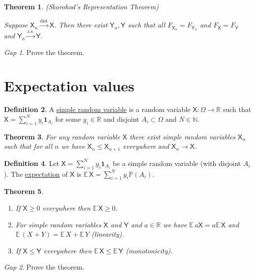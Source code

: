 \documentclass[11pt]{article}
\newcommand{\rv}[1]{\mathsf{#1}}
\newcommand{\p}{\mathbb{P}}
\newcommand{\ex}{\mathbb{E}\,}
\newcommand{\ind}[1]{\mathbf{1}_{#1}}
\newcommand{\defname}[1]{\underline{#1}}
\newcommand{\asto}{\xrightarrow{\text{a.s.}}}
\newcommand{\disto}{\xrightarrow{\text{dist}}}
\newcommand{\NN}{\mathbb{N}}
\newcommand{\RR}{\mathbb{R}}
\theoremstyle{theorem}
\newtheorem{theorem}{Theorem}[section]
\theoremstyle{definition}
\newtheorem{definition}[theorem]{Definition}
\theoremstyle{remark}
\theoremstyle{step}
\theoremstyle{gap}
\newtheorem*{gap}{Gap}
\begin{document}
\begin{theorem}{(Skorohod's Representation Theorem)}\ 

Suppose \(\rv{X}_n \disto \rv{X}\). Then there exist \(\rv{Y}_n, \rv{Y}\) such that all \(F_{\rv{X}_n} = F_{\rv{Y}_n}\) and \(F_\rv{X} = F_\rv{Y}\) and \(\rv{Y}_n \asto \rv{Y}\).
\end{theorem}

\begin{gap}
Prove the theorem.
\end{gap}


\section{Expectation values}

\begin{definition}
A \defname{simple random variable} is a random variable \(\rv{X}:\Omega \to \RR\) such that \(\rv{X} = \sum_{i=1}^N y_i \ind{A_i}\) for some \(y_i \in \RR\) and disjoint \(A_i \subset \Omega\) and \(N \in \NN\).
\end{definition}

\begin{theorem}
For any random variable \(\rv{X}\) there exist simple random variables \(\rv{X}_n\) such that for all \(n\) we have \(\rv{X}_n \leq \rv{X}_{n+1}\) everywhere and \(\rv{X}_n \to \rv{X}\).
\end{theorem}

\begin{definition}
Let \(\rv{X} = \sum_{i=1}^N y_i \ind{A_i}\) be a simple random variable (with disjoint \(A_i\)). The \defname{expectation} of \(\rv{X}\) is \(\ex \rv{X} = \sum_{i=1}^N y_i \p(A_i)\).
\end{definition}

\begin{theorem}\ 
\begin{enumerate}
\item If \(\rv{X} \geq 0\) everywhere then \(\ex \rv{X} \geq 0\).
\item For simple random variables \(\rv{X}\) and \(\rv{Y}\) and \(a \in \RR\) we have \(\ex a \rv{X} = a \ex \rv{X}\) and \(\ex (X+Y) = \ex X + \ex Y\) (linearity).
\item If \(\rv{X} \leq \rv{Y}\) everywhere then \(\ex\rv{X} \leq \ex\rv{Y}\) (monotonicity).
\end{enumerate}
\end{theorem}

\begin{gap}
Prove the theorem.
\end{gap}
\end{document}
